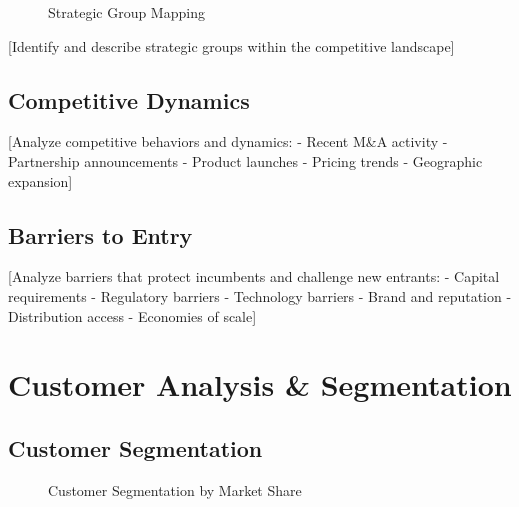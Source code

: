 \documentclass[11pt,letterpaper]{report}
\begin{document}

\begin{figure}[htbp]
\centering
\caption{Strategic Group Mapping}
\label{fig:strategic_groups}
\end{figure}

[Identify and describe strategic groups within the competitive landscape]

\section{Competitive Dynamics}

[Analyze competitive behaviors and dynamics:
- Recent M\&A activity
- Partnership announcements
- Product launches
- Pricing trends
- Geographic expansion]

\section{Barriers to Entry}

[Analyze barriers that protect incumbents and challenge new entrants:
- Capital requirements
- Regulatory barriers
- Technology barriers
- Brand and reputation
- Distribution access
- Economies of scale]

\chapter{Customer Analysis \& Segmentation}

\section{Customer Segmentation}


\begin{figure}[htbp]
\centering
\caption{Customer Segmentation by Market Share}
\label{fig:customer_segments}
\end{figure}
\end{document}
